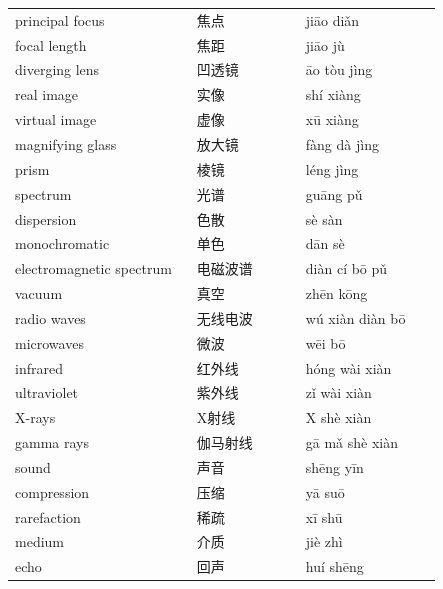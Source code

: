 \documentclass[11pt]{article}
\begin{document}
\begin{longtable}{@{}p{0.40\linewidth}p{0.24\linewidth}p{0.30\linewidth}@{}}
principal focus & 焦点 & jiāo diǎn \\
focal length & 焦距 & jiāo jù \\
diverging lens & 凹透镜 & āo tòu jìng \\
real image & 实像 & shí xiàng \\
virtual image & 虚像 & xū xiàng \\
magnifying glass & 放大镜 & fàng dà jìng \\
prism & 棱镜 & léng jìng \\
spectrum & 光谱 & guāng pǔ \\
dispersion & 色散 & sè sàn \\
monochromatic & 单色 & dān sè \\
electromagnetic spectrum & 电磁波谱 & diàn cí bō pǔ \\
vacuum & 真空 & zhēn kōng \\
radio waves & 无线电波 & wú xiàn diàn bō \\
microwaves & 微波 & wēi bō \\
infrared & 红外线 & hóng wài xiàn \\
ultraviolet & 紫外线 & zǐ wài xiàn \\
X-rays & X射线 & X shè xiàn \\
gamma rays & 伽马射线 & gā mǎ shè xiàn \\
sound & 声音 & shēng yīn \\
compression & 压缩 & yā suō \\
rarefaction & 稀疏 & xī shū \\
medium & 介质 & jiè zhì \\
echo & 回声 & huí shēng \\
\end{longtable}
\end{document}
